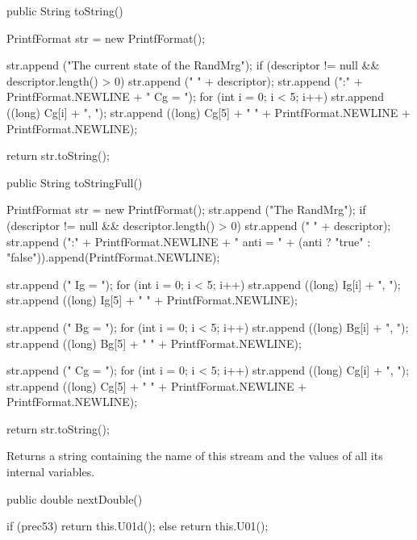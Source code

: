 \begin{code}\begin{hide}
   public String toString() {
       PrintfFormat str = new PrintfFormat();
       
       str.append ("The current state of the RandMrg");
       if (descriptor != null && descriptor.length() > 0)
          str.append (" " + descriptor);
       str.append (":" + PrintfFormat.NEWLINE + "   Cg = { ");
       for (int i = 0; i < 5; i++)
          str.append ((long) Cg[i] + ", ");
       str.append ((long) Cg[5] + " }" + PrintfFormat.NEWLINE +
              PrintfFormat.NEWLINE);
     
       return str.toString();
   }\end{hide} 

   public String toStringFull() \begin{hide} {
       PrintfFormat str = new PrintfFormat();
       str.append ("The RandMrg");
       if (descriptor != null && descriptor.length() > 0)
          str.append (" " + descriptor);
       str.append (":" + PrintfFormat.NEWLINE + "   anti = " +
          (anti ? "true" : "false")).append(PrintfFormat.NEWLINE);

       str.append ("   Ig = { ");
       for (int i = 0; i < 5; i++)
          str.append ((long) Ig[i] + ", ");
       str.append ((long) Ig[5] + " }" + PrintfFormat.NEWLINE);

       str.append ("   Bg = { ");
       for (int i = 0; i < 5; i++)
          str.append ((long) Bg[i] + ", ");
       str.append ((long) Bg[5] + " }" + PrintfFormat.NEWLINE);

       str.append ("   Cg = { ");
       for (int i = 0; i < 5; i++)
          str.append ((long) Cg[i] + ", ");
       str.append ((long) Cg[5] + " }" + PrintfFormat.NEWLINE +
           PrintfFormat.NEWLINE);
 
       return str.toString();
   }\end{hide}
\end{code}
 \begin{tabb} Returns a string containing the name of this stream and the 
   values of all its internal variables.
 \end{tabb}
\begin{htmlonly}
\end{htmlonly}
\begin{code}

   public double nextDouble() \begin{hide} {
      if (prec53) return this.U01d();
      else return this.U01();
   }\end{hide}
\end{code}
